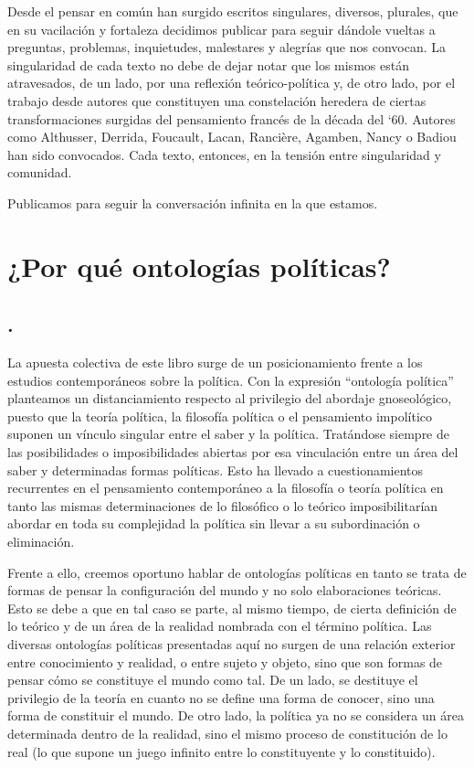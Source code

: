 Desde el pensar en común han surgido escritos singulares, diversos, plurales, que en su vacilación y fortaleza decidimos publicar para seguir dándole vueltas a preguntas, problemas, inquietudes, malestares y alegrías que nos convocan. La singularidad de cada texto no debe de dejar notar que los mismos están atravesados, de un lado, por una reflexión teórico-política y, de otro lado, por el trabajo desde autores que constituyen una constelación heredera de ciertas transformaciones surgidas del pensamiento francés de la década del `60. Autores como Althusser, Derrida, Foucault, Lacan, Rancière, Agamben, Nancy o Badiou han sido convocados. Cada texto, entonces, en la tensión entre singularidad y comunidad.

Publicamos para seguir la conversación infinita en la que estamos.

\chapter{¿Por qué ontologías políticas?}


\section*{.}


La apuesta colectiva de este libro surge de un posicionamiento frente a los estudios contemporáneos sobre la política. Con la expresión \enquote{ontología política} planteamos un distanciamiento respecto al privilegio del abordaje gnoseológico, puesto que la teoría política, la filosofía política o el pensamiento impolítico suponen un vínculo singular entre el saber y la política. Tratándose siempre de las posibilidades o imposibilidades abiertas por esa vinculación entre un área del saber y determinadas formas políticas. Esto ha llevado a cuestionamientos recurrentes en el pensamiento contemporáneo a la filosofía o teoría política en tanto las mismas determinaciones de lo filosófico o lo teórico imposibilitarían abordar en toda su complejidad la política sin llevar a su subordinación o eliminación.

Frente a ello, creemos oportuno hablar de ontologías políticas en tanto se trata de formas de pensar la configuración del mundo y no solo elaboraciones teóricas. Esto se debe a que en tal caso se parte, al mismo tiempo, de cierta definición de lo teórico y de un área de la realidad nombrada con el término política. Las diversas ontologías políticas presentadas aquí no surgen de una relación exterior entre conocimiento y realidad, o entre sujeto y objeto, sino que son formas de pensar cómo se constituye el mundo como tal. De un lado, se destituye el privilegio de la teoría en cuanto no se define una forma de conocer, sino una forma de constituir el mundo. De otro lado, la política ya no se considera un área determinada dentro de la realidad, sino el mismo proceso de constitución de \linebreak  lo real (lo que supone un juego infinito entre lo constituyente y lo constituido).

